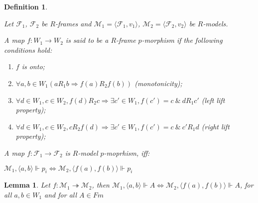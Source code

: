\documentclass[a4paper]{article}
\theoremstyle{defin}
\newtheorem{defin}{Definition}
\theoremstyle{theorem}
\theoremstyle{prop}
\theoremstyle{lemma}
\newtheorem{lemma}{Lemma}
\theoremstyle{ex}
\theoremstyle{col}
\begin{document}
\begin{defin}
  $ $

  Let $\mathcal{F}_1$, $\mathcal{F}_2$ be $R$-frames and
  $\mathcal{M}_1 = \langle \mathcal{F}_1, v_1 \rangle$, $\mathcal{M}_2 = \langle \mathcal{F}_2, v_2 \rangle$
  be $R$-models.

  A map $f : W_1 \to W_2$ is said to be a $R$-frame $p$-morphism if the following conditions hold:

  \begin{enumerate}
    \item $f$ is onto;
    \item $\forall a, b \in W_1 (a R_1 b \Rightarrow f(a) R_2 f (b))$ (monotonicity);
    \item $\forall d \in W_1, c \in W_2, f(d) R_2 c \Rightarrow \exists c' \in W_1, f(c') = c \: \& \: d R_1 c'$ (left lift property);
    \item $\forall d \in W_1, c \in W_2, c R_2 f(d) \Rightarrow \exists c' \in W_1, f(c') = c \: \& \: c' R_1 d$ (right lift property);
  \end{enumerate}

  A map $f : \mathcal{F}_1 \to \mathcal{F}_2$ is $R$-model $p$-moprhism, iff:

\begin{center}
 $\mathcal{M}_1, \langle a, b \rangle \Vdash p_i \Leftrightarrow \mathcal{M}_2, \langle f(a), f(b) \rangle \Vdash p_i$
\end{center}

\end{defin}

\begin{lemma}
  Let $f : \mathcal{M}_1 \twoheadrightarrow \mathcal{M}_2$, then
  $\mathcal{M}_1, \langle a, b \rangle \Vdash A \Leftrightarrow \mathcal{M}_2, \langle f(a), f(b) \rangle \Vdash A$,
  for all $a, b \in W_1$ and for all $A \in Fm$
\end{lemma}
\end{document}
